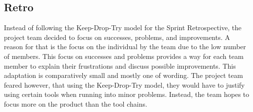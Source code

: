 \subsection{Retro}\label{subsec:retro}
Instead of following the Keep-Drop-Try model for the Sprint Retrospective, the project team decided to focus on successes, problems, and improvements.
A reason for that is the focus on the individual by the team due to the low number of members.
This focus on successes and problems provides a way for each team member to explain their frustrations and discuss possible improvements.
This adaptation is comparatively small and mostly one of wording.
The project team feared however, that using the Keep-Drop-Try model, they would have to justify using certain tools when running into minor problems.
Instead, the team hopes to focus more on the product than the tool chains.
